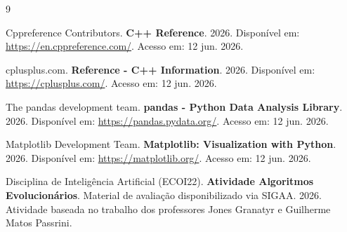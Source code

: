 \documentclass[conference]{IEEEtran}
\begin{document}
\begin{thebibliography}{9}
	
	Cppreference Contributors. \textbf{C++ Reference}. 2026. Disponível em: \url{https://en.cppreference.com/}. Acesso em: 12 jun. 2026.
	
	cplusplus.com. \textbf{Reference - C++ Information}. 2026. Disponível em: \url{https://cplusplus.com/}. Acesso em: 12 jun. 2026.
	
	The pandas development team. \textbf{pandas - Python Data Analysis Library}. 2026. Disponível em: \url{https://pandas.pydata.org/}. Acesso em: 12 jun. 2026.
	
	Matplotlib Development Team. \textbf{Matplotlib: Visualization with Python}. 2026. Disponível em: \url{https://matplotlib.org/}. Acesso em: 12 jun. 2026.
	
	Disciplina de Inteligência Artificial (ECOI22). \textbf{Atividade Algoritmos Evolucionários}. Material de avaliação disponibilizado via SIGAA. 2026. Atividade baseada no trabalho dos professores Jones Granatyr e Guilherme Matos Passrini.
	
\end{thebibliography}
\end{document}

